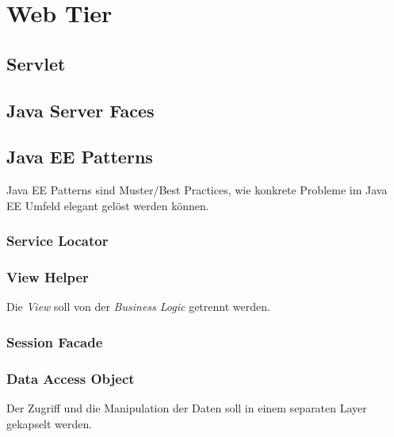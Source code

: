 \chapter{Web Tier}

\section{Servlet}

\section{Java Server Faces}

\section{Java EE Patterns}
Java EE Patterns sind Muster/Best Practices, wie konkrete Probleme im Java EE Umfeld elegant gelöst werden können.

\subsection{Service Locator}

\subsection{View Helper}

Die \emph{View} soll von der \emph{Business Logic} getrennt werden.



\subsection{Session Facade}


\subsection{Data Access Object}
Der Zugriff und die Manipulation der Daten soll in einem separaten Layer gekapselt werden. 
